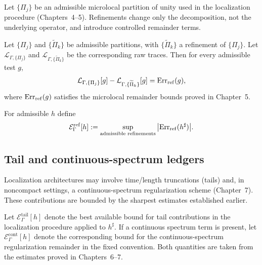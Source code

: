 Let $\{\Pi_j\}$ be an admissible microlocal partition of unity used in the localization procedure (Chapters~4--5).
Refinements change only the decomposition, not the underlying operator, and introduce controlled remainder terms.

\begin{assumption}\label{ass:08.refine-stability}
Let $\{\Pi_j\}$ and $\{\widetilde\Pi_k\}$ be admissible partitions, with $\{\widetilde\Pi_k\}$ a refinement of $\{\Pi_j\}$.
Let $\mathcal L_{\Gamma,\{\Pi_j\}}$ and $\mathcal L_{\Gamma,\{\widetilde\Pi_k\}}$ be the corresponding raw traces.
Then for every admissible test $g$,
\begin{equation}\label{eq:08.ref.err}
\mathcal L_{\Gamma,\{\Pi_j\}}[g]-\mathcal L_{\Gamma,\{\widetilde\Pi_k\}}[g]=\mathrm{Err}_{\mathrm{ref}}(g),
\end{equation}
where $\mathrm{Err}_{\mathrm{ref}}(g)$ satisfies the microlocal remainder bounds proved in Chapter~5.
\end{assumption}

\begin{definition}\label{def:08.ref-ledger}
For admissible $h$ define
\begin{equation}\label{eq:08.E.ref}
\mathcal E^{\mathrm{ref}}_\Gamma[h]
:=\sup_{\text{admissible refinements}} \big|\mathrm{Err}_{\mathrm{ref}}(h^\sharp)\big|.
\end{equation}
\end{definition}

\subsection{Tail and continuous-spectrum ledgers}\label{subsec:08.tail-cont}

Localization architectures may involve time/length truncations (tails) and, in noncompact settings, a continuous-spectrum
regularization scheme (Chapter~7). These contributions are bounded by the sharpest estimates established earlier.

\begin{definition}\label{def:08.tail-cont-ledgers}
Let $\mathcal E^{\mathrm{tail}}_\Gamma[h]$ denote the best available bound for tail contributions in the localization procedure applied to $h^\sharp$.
If a continuous spectrum term is present, let $\mathcal E^{\mathrm{cont}}_\Gamma[h]$ denote the corresponding bound for the continuous-spectrum
regularization remainder in the fixed convention.
Both quantities are taken from the estimates proved in Chapters~6--7.
\end{definition}

